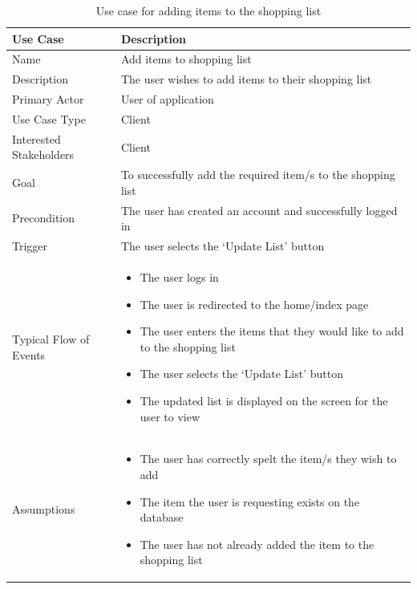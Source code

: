 \documentclass[10pt,twocolumn]{witseiepaper}
\begin{document}
		\begin{table}[h]
			\centering
			\caption{Use case for adding items to the shopping list}
			\label{uc:add_item}
			\begin{tabular}{|p{}|p{}|}
				\hline
				\textbf{Use Case} & \textbf{Description} \\ \hline
				Name & Add items to shopping list \\ \hline
				Description & The user wishes to add items to their shopping list \\ \hline
				Primary Actor & User of application \\ \hline
				Use Case Type & Client \\ \hline
				Interested Stakeholders & Client \\ \hline
				Goal & To successfully add the required item/s to the shopping list \\ \hline
				Precondition & The user has created an account and successfully logged in \\ \hline
				Trigger & The user selects the `Update List' button \\ \hline
				Typical Flow of Events & 
				\begin{itemize}
					\item The user logs in
					\item The user is redirected to the home/index page
					\item The user enters the items that they would like to add to the shopping list
					\item The user selects the `Update List' button
					\item The updated list is displayed on the screen for the user to view
				\end{itemize}
				\\ \hline
				Assumptions &
					\begin{itemize}
						\item The user has correctly spelt the item/s they wish to add
						\item The item the user is requesting exists on the database
						\item The user has not already added the item to the shopping list
					\end{itemize}
					\\ \hline
			\end{tabular}
		\end{table}
		
\end{document}
